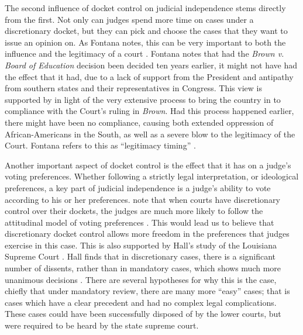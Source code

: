 \documentclass[12pt]{article}
\begin{document}
The second influence of docket control on judicial independence stems directly from the first.  Not only can judges spend more time on cases under a discretionary docket, but they can pick and choose the cases that they want to issue an opinion on.  As Fontana notes, this can be very important to both the influence and the legitimacy of a court \citep{Fontana2011}.  Fontana notes that had the \textit{Brown v. Board of Education} decision been decided ten years earlier, it might not have had the effect that it had, due to a lack of support from the President and antipathy from southern states and their representatives in Congress.  This view is supported by \citet{Rosenberg1991} in light of the very extensive process to bring the country in to compliance with the Court's ruling in \textit{Brown}.  Had this process happened earlier, there might have been no compliance, causing both extended oppression of African-Americans in the South, as well as a severe blow to the legitimacy of the Court.  Fontana refers to this as ``legitimacy timing'' \citep[627]{Fontana2011}.  

Another important aspect of docket control is the effect that it has on a judge's voting preferences.  Whether following a strictly legal interpretation, or ideological preferences, a key part of judicial independence is a judge's ability to vote according to his or her preferences.  \citeauthor{Songer2003} note that when courts have discretionary control over their dockets, the judges are much more likely to follow the attitudinal model of voting preferences \citep{Songer2003}.  This would lead us to believe that discretionary docket control allows more freedom in the preferences that judges exercise in this case.   This is also supported by Hall's study of the Louisiana Supreme Court \citep{Hall1987a,Hall1987b}.  Hall finds that in discretionary cases, there is a significant number of dissents, rather than in mandatory cases, which shows much more unanimous decisions \citep{Hall1985}.  There are several hypotheses for why this is the case, chiefly that under mandatory review, there are many more ``easy'' cases; that is cases which have a clear precedent and had no complex legal complications.  These cases could have been successfully disposed of by the lower courts, but were required to be heard by the state supreme court.   
\end{document}
